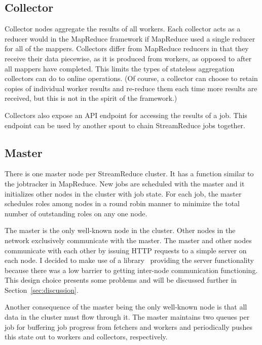 \documentclass[12pt,twocolumn]{article}
\begin{document}
\subsection{Collector}
Collector nodes aggregate the results of all workers. Each collector acts as a reducer would
in the MapReduce framework if MapReduce used a single reducer for all of the mappers.
Collectors differ from MapReduce reducers in that they receive their data piecewise, as it
is produced from workers, as opposed to after all mappers have completed. This limits the
types of stateless aggregation collectors can do to online operations. (Of course, a collector
can choose to retain copies of individual worker results and re-reduce them each time more
results are received, but this is not in the spirit of the framework.)

Collectors also expose an API endpoint for accessing the results of a job. This endpoint
can be used by another spout to chain StreamReduce jobs together.
\subsection{Master}
\label{sec:master}
There is one master node per StreamReduce cluster. It has a function similar to the
jobtracker in
MapReduce. New jobs are scheduled with the master and it initializes other nodes in the
cluster with job state. For each job, the master schedules roles among nodes in a round
robin
manner to minimize the total number of outstanding roles on any one node.

The master is the only well-known node in the cluster. Other nodes in the network
exclusively
communicate with the master. The master and other nodes communicate with each other by
issuing
HTTP requests to a simple server on each node. I decided to make use of a
library~\cite{sinatrarb}
providing the server functionality because there was a low barrier to getting inter-node
communication functioning. This design choice presents some problems and will be
discussed
further in Section~\ref{sec:discussion}.

Another consequence of the master being the only well-known node is that all data in the
cluster must flow through it. The master maintains two queues per job for buffering job
progress from fetchers and workers and periodically pushes this state out to workers and
collectors, respectively.
\end{document}
